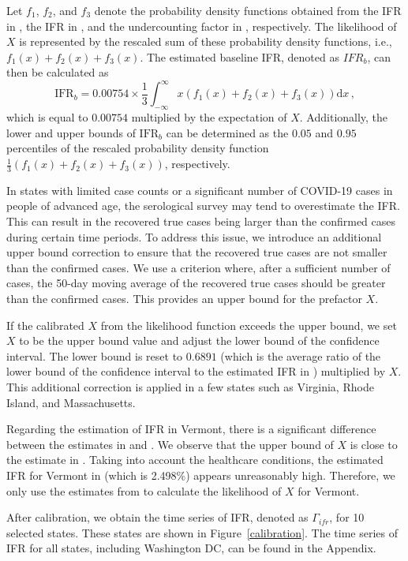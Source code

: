 \documentclass[sn-mathphys,Numbered]{sn-jnl}
\begin{document}
Let $f_1$, $f_2$, and $f_3$ denote the probability density functions obtained from the IFR in \cite{IHME}, the IFR in \cite{TrueInfection1}, and the undercounting factor in \cite{TrueInfection1}, respectively. The likelihood of $X$ is represented by the rescaled sum of these probability density functions, i.e., $f_1(x) + f_2(x) + f_3(x)$. The estimated baseline IFR, denoted as $IFR_b$, can then be calculated as 
$$
    \mathrm{IFR}_b = 0.00754 \times \frac{1}{3}\int_{-\infty}^{\infty} x (f_1(x) + f_2(x) + f_3(x) ) \mathrm{d}x \,,
$$
which is equal to $0.00754$ multiplied by the expectation of $X$. Additionally, the lower and upper bounds of $\mathrm{IFR}_b$ can be determined as the $0.05$ and $0.95$ percentiles of the rescaled probability density function $\frac{1}{3}(f_1(x) + f_2(x) + f_3(x))$, respectively. 

In states with limited case counts or a significant number of COVID-19 cases in people of advanced age, the serological survey may tend to overestimate the IFR. This can result in the recovered true cases being larger than the confirmed cases during certain time periods. To address this issue, we introduce an additional upper bound correction to ensure that the recovered true cases are not smaller than the confirmed cases. We use a criterion where, after a sufficient number of cases, the 50-day moving average of the recovered true cases should be greater than the confirmed cases. This provides an upper bound for the prefactor $X$.

If the calibrated $X$ from the likelihood function exceeds the upper bound, we set $X$ to be the upper bound value and adjust the lower bound of the confidence interval. The lower bound is reset to $0.6891$ (which is the average ratio of the lower bound of the confidence interval to the estimated IFR in \cite{IHME}) multiplied by $X$. This additional correction is applied in a few states such as Virginia, Rhode Island, and Massachusetts. 

Regarding the estimation of IFR in Vermont, there is a significant difference between the estimates in \cite{IHME} and \cite{TrueInfection1}. We observe that the upper bound of $X$ is close to the estimate in \cite{TrueInfection1}. Taking into account the healthcare conditions, the estimated IFR for Vermont in \cite{IHME} (which is 2.498\%) appears unreasonably high. Therefore, we only use the estimates from \cite{TrueInfection1} to calculate the likelihood of $X$ for Vermont. 

After calibration, we obtain the time series of IFR, denoted as $\Gamma_{ifr}$, for 10 selected states. These states are shown in Figure~\ref{calibration}. The time series of IFR for all states, including Washington DC, can be found in the Appendix.
\end{document}
